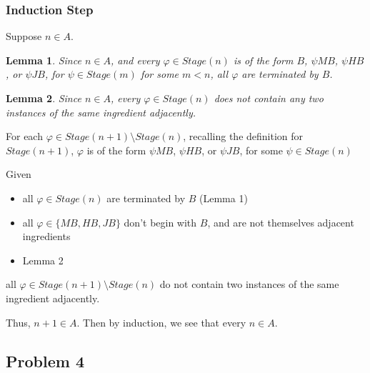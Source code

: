 \documentclass[a4paper]{article}
\newtheorem{lemma}{Lemma}
\newcommand{\SET}[1]{\{ {#1} \}}
\begin{document}
\begin{enumerate}
    \subsubsection*{Induction Step}
    Suppose $n \in A$.
    
    \begin{lemma}
    Since $n \in A$, and every $\varphi \in Stage(n)$ is of the form $B$, $\psi MB$, $\psi HB$, or $\psi JB$, for $\psi \in Stage(m)$ for some $m < n$, all $\varphi$ are terminated by $B$.
    \end{lemma}

    \begin{lemma}
    Since $n \in A$, every $\varphi \in Stage(n)$ does not contain any two instances of the same ingredient adjacently.
    \end{lemma}

        For each $\varphi \in Stage(n + 1) \setminus Stage(n)$, recalling the definition for $Stage(n + 1)$, $\varphi$ is of the form $\psi MB$, $\psi HB$, or $\psi JB$, for some $\psi \in Stage(n)$

        Given \begin{itemize}
            \item all $\varphi \in Stage(n)$ are terminated by $B$ (Lemma 1)
            \item all $\varphi \in \SET{MB, HB, JB}$ don't begin with $B$, and are not themselves adjacent ingredients
            \item Lemma 2
        \end{itemize}
        
        all $\varphi \in Stage(n + 1) \setminus Stage(n)$ do not contain two instances of the same ingredient adjacently. 

        Thus, $n + 1 \in A$. Then by induction, we see that every $n \in A$.
    
    \subsection*{Problem 4}

\end{enumerate}
\end{document}

